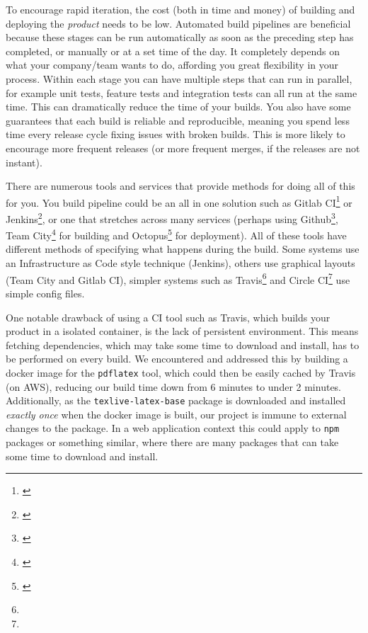 To encourage rapid iteration, the cost (both in time and money) of building and deploying the \textit{product} needs to be low. 
Automated build pipelines are beneficial because these stages can be run automatically as soon as the preceding step has completed,
or manually or at a set time of the day.
It completely depends on what your company/team wants to do, affording you great flexibility in your process.
Within each stage you can have multiple steps that can run in parallel,
for example unit tests, feature tests and integration tests can all run at the same time.
This can dramatically reduce the time of your builds.
You also have some guarantees that each build is reliable and reproducible,
meaning you spend less time every release cycle fixing issues with broken builds.
This is more likely to encourage more frequent releases (or more frequent merges, if the releases are not instant).
\par
There are numerous tools and services that provide methods for doing all of this for you.
You build pipeline could be an all in one solution such as Gitlab CI\footnote{\label{gitlab-ci}} or Jenkins\footnote{\label{jenkins}},
or one that stretches across many services (perhaps using Github\footnote{\label{github}}, Team City\footnote{\label{team-city}} for building and Octopus\footnote{\label{octopus}} for deployment).
All of these tools have different methods of specifying what happens during the build.
Some systems use an Infrastructure as Code style technique (Jenkins),
others use graphical layouts (Team City and Gitlab CI),
simpler systems such as Travis\footnote{} and Circle CI\footnote{} use simple config files.
\par
One notable drawback of using a CI tool such as Travis, which builds your product in a isolated container, is the lack of persistent environment. This means fetching dependencies, which may take some time to download and install, has to be performed on every build. We encountered and addressed this by building a docker image for the \texttt{pdflatex} tool, which could then be easily cached by Travis (on AWS), reducing our build time down from 6 minutes to under 2 minutes.
Additionally, as the \texttt{texlive-latex-base} package is downloaded and installed \textit{exactly once} when the docker image is built, our project is    immune to external changes to the package. 
In a web application context this could apply to \texttt{npm} packages or something similar,
where there are many packages that can take some time to download and install.
